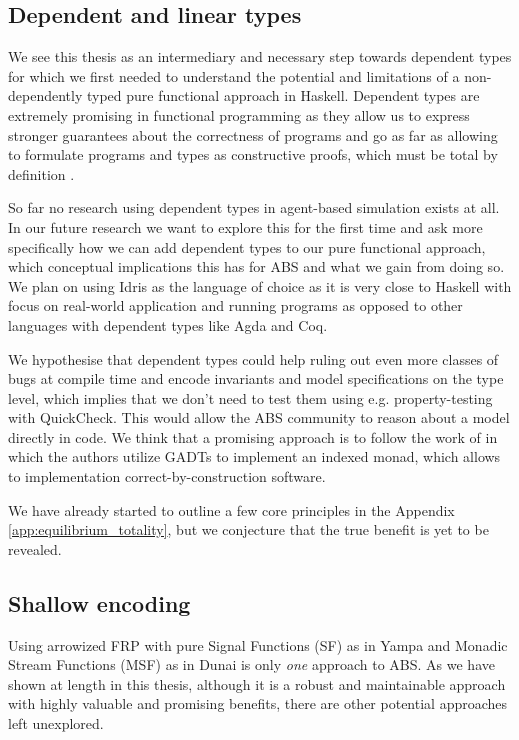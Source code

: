\subsection{Dependent and linear types}
We see this thesis as an intermediary and necessary step towards dependent types for which we first needed to understand the potential and limitations of a non-dependently typed pure functional approach in Haskell. Dependent types are extremely promising in functional programming as they allow us to express stronger guarantees about the correctness of programs and go as far as allowing to formulate programs and types as constructive proofs, which must be total by definition \cite{altenkirch_pi_2010, altenkirch_why_2005, thompson_type_1991}.

So far no research using dependent types in agent-based simulation exists at all. In our future research we want to explore this for the first time and ask more specifically how we can add dependent types to our pure functional approach, which conceptual implications this has for ABS and what we gain from doing so. We plan on using Idris \cite{brady_idris_2013} as the language of choice as it is very close to Haskell with focus on real-world application and running programs as opposed to other languages with dependent types like Agda and Coq.

We hypothesise that dependent types could help ruling out even more classes of bugs at compile time and encode invariants and model specifications on the type level, which implies that we don't need to test them using e.g. property-testing with QuickCheck. This would allow the ABS community to reason about a model directly in code. We think that a promising approach is to follow the work of \cite{brady_programming_2013, brady_state_2016, fowler_dependent_2014} in which the authors utilize GADTs to implement an indexed monad, which allows to implementation correct-by-construction software.

We have already started to outline a few core principles in the Appendix \ref{app:equilibrium_totality}, but we conjecture that the true benefit is yet to be revealed.

\subsection{Shallow encoding}
Using arrowized FRP with pure Signal Functions (SF) as in Yampa and Monadic Stream Functions (MSF) as in Dunai is only \textit{one} approach to ABS. As we have shown at length in this thesis, although it is a robust and maintainable approach with highly valuable and promising benefits, there are other potential approaches left unexplored.

